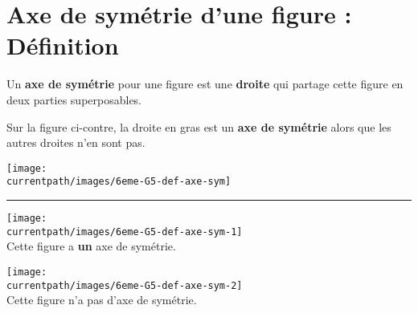 \section{Axe de symétrie d'une figure : Définition}
\begin{definition}
    Un \textbf{axe de symétrie} pour une figure est une \textbf{droite} qui partage cette figure en deux parties superposables.
\end{definition}
\begin{exemples*1}
    \phantom{rrr}

    \begin{minipage}{0.35\linewidth}
        Sur la figure ci-contre, la droite en gras est un \textbf{axe de symétrie} alors que les autres droites n'en sont pas.
    \end{minipage}
    \hspace{1cm}
    \begin{minipage}{0.6\linewidth}
        \texttt{[image: \\currentpath/images/6eme-G5-def-axe-sym]} 
    \end{minipage}
    \hrule
    \begin{minipage}{0.45\linewidth}
        \begin{center}
            \texttt{[image: \\currentpath/images/6eme-G5-def-axe-sym-1]}\\
            Cette figure a \textbf{un} axe de symétrie.
        \end{center}
    \end{minipage}
    \vrule
    \begin{minipage}{0.45\linewidth}
        \begin{center}
            \texttt{[image: \\currentpath/images/6eme-G5-def-axe-sym-2]}\\ 
            Cette figure n'a pas d'axe de symétrie.
        \end{center}
    \end{minipage}
\end{exemples*1}

